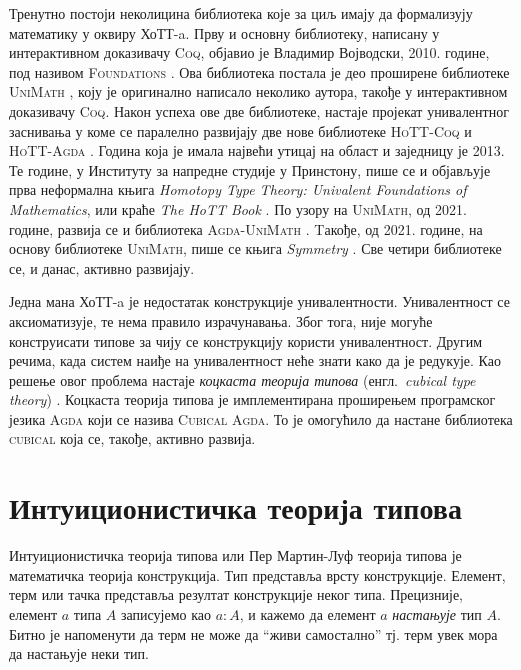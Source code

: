 \documentclass[12pt,oneside]{memoir}
\begin{document}
Тренутно постоји неколицина библиотека које за циљ имају да формализују математику у оквиру ХоТТ-a. Прву и основну библиотеку, написану у интерактивном доказивачу \textsc{Coq}, објавио је Владимир Војводски, 2010. године, под називом \textsc{Foundations} \cite{vlad_found}. Ова библиотека постала је део проширене библиотеке \textsc{UniMath} \cite{unimath}, коју је оригинално написало неколико аутора, такође у интерактивном доказивачу \textsc{Coq}. Након успеха ове две библиотеке, настаје пројекат унивалентног заснивања у коме се паралелно развијају две нове библиотеке \textsc{HoTT-Coq} \cite{hottcoq} и \textsc{HoTT-Agda} \cite{hottagda}. Година која је имала највећи утицај на област и заједницу је 2013. Те године, у Институту за напредне студије у Принстону, пише се и објављује прва неформална књига \emph{Homotopy Type Theory: Univalent Foundations of Mathematics}, или краће \emph{The HoTT Book} \cite{hottbook}. По узору на \textsc{UniMath}, од 2021. године, развија се и библиотека \textsc{Agda-UniMath} \cite{agda-unimath}. Tакође, од 2021. године, на основу библиотеке \textsc{UniMath}, пише се књига \emph{Symmetry} \cite{symm}. Све четири библиотеке се, и данас, активно развијају.

Једна мана ХоТТ-a је недостатак конструкције унивалентности. Унивалентност се аксиоматизује, те нема правило израчунавања. Због тога, није могуће конструисати типове за чију се конструкцију користи унивалентност. Другим речима, када систем наиђе на унивалентност неће знати како да је редукује. Као решење овог проблема настаје \emph{коцкаста теорија типова} (енгл.~\emph{cubical type theory}) \cite{cube}. Коцкаста теорија типова је имплементирана проширењем програмског језика \textsc{Agda} који се назива \textsc{Cubical Agda}. То је омогућило да настане библиотека \textsc{cubical} \cite{cubi} која се, такође, активно развија.

\chapter{Интуиционистичка теорија типова}

Интуиционистичка теорија типова или Пер Мартин-Луф теорија типова је математичка теорија конструкција. Тип представља врсту конструкције. Елемент, терм или тачка представља резултат конструкције неког типа. Прецизније, елемент $a$ типа $A$ записујемо као $a : A$, и кажемо да елемент $a$ \emph{настањује} тип $A$. Битно је напоменути да терм не може да ``живи самостално'' тј. терм увек мора да настањује неки тип. 
\end{document}
